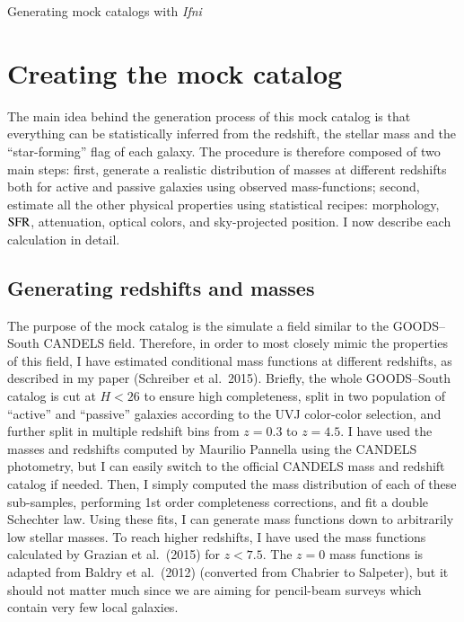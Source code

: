 \documentclass[12pt,a4paper]{article}
\newcommand{\ifni}{\textit{Ifni}\xspace}
\newcommand{\sfr}{{\rm SFR}}
\begin{document}

\begin{center}
{\huge Generating mock catalogs with \ifni}
\end{center}

\section{Creating the mock catalog}

The main idea behind the generation process of this mock catalog is that everything can be statistically inferred from the redshift, the stellar mass and the ``star-forming'' flag of each galaxy. The procedure is therefore composed of two main steps: first, generate a realistic distribution of masses at different redshifts both for active and passive galaxies using observed mass-functions; second, estimate all the other physical properties using statistical recipes: morphology, $\sfr$, attenuation, optical colors, and sky-projected position. I now describe each calculation in detail.


\subsection{Generating redshifts and masses}

The purpose of the mock catalog is the simulate a field similar to the GOODS--South CANDELS field. Therefore, in order to most closely mimic the properties of this field, I have estimated conditional mass functions at different redshifts, as described in my paper (Schreiber et al.~2015). Briefly, the whole GOODS--South catalog is cut at $H<26$ to ensure high completeness, split in two population of ``active'' and ``passive'' galaxies according to the UVJ color-color selection, and further split in multiple redshift bins from $z=0.3$ to $z=4.5$. I have used the masses and redshifts computed by Maurilio Pannella using the CANDELS photometry, but I can easily switch to the official CANDELS mass and redshift catalog if needed. Then, I simply computed the mass distribution of each of these sub-samples, performing 1st order completeness corrections, and fit a double Schechter law. Using these fits, I can generate mass functions down to arbitrarily low stellar masses. To reach higher redshifts, I have used the mass functions calculated by Grazian et al.~(2015) for $z < 7.5$. The $z=0$ mass functions is adapted from Baldry et al.~(2012) (converted from Chabrier to Salpeter), but it should not matter much since we are aiming for pencil-beam surveys which contain very few local galaxies.
\end{document}
